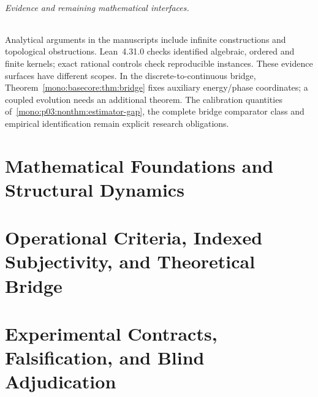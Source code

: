 \documentclass[11pt,a4paper,openany]{book}
\begin{document}
\paragraph{Evidence and remaining mathematical interfaces.}
Analytical arguments in the manuscripts include infinite constructions and
topological obstructions. Lean~4.31.0 checks identified algebraic, ordered and
finite kernels; exact rational controls check reproducible instances. These
evidence surfaces have different scopes. In the discrete-to-continuous bridge,
Theorem~\ref{mono:basecore:thm:bridge} fixes auxiliary energy/phase coordinates;
a coupled evolution needs an additional theorem. The calibration quantities
of~\ref{mono:p03:nonthm:estimator-gap}, the complete bridge comparator class and
empirical identification remain explicit research obligations.

\tableofcontents
\mainmatter
\part{Mathematical Foundations and Structural Dynamics}




\part{Operational Criteria, Indexed Subjectivity, and Theoretical Bridge}





\part{Experimental Contracts, Falsification, and Blind Adjudication}



\backmatter
\printbibliography[heading=bibintoc]
\clearpage
\end{document}
